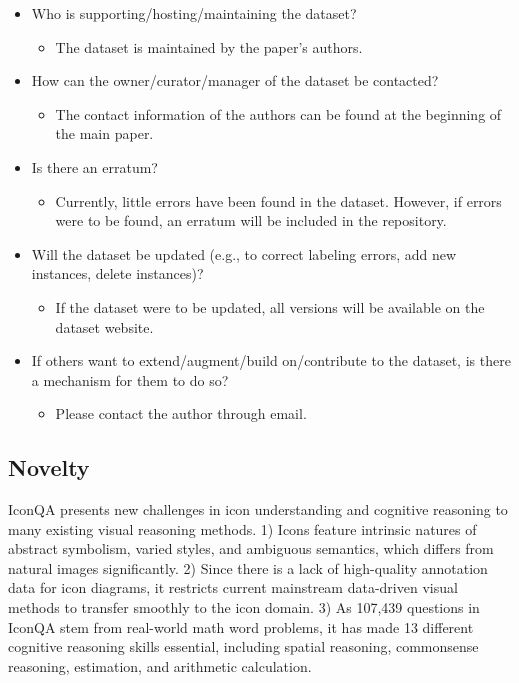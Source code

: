 \documentclass{article}
\begin{document}
\begin{itemize}
    \item Who is supporting/hosting/maintaining the dataset?
    \begin{itemize}
        \item The dataset is maintained by the paper's authors.
    \end{itemize}
    \item How can the owner/curator/manager of the dataset be contacted?
    \begin{itemize}
        \item The contact information of the authors can be found at the beginning of the main paper.
    \end{itemize}
    \item Is there an erratum?
    \begin{itemize}
        \item Currently, little errors have been found in the dataset. However, if errors were to be found, an erratum will be included in the repository.
    \end{itemize}
    \item Will the dataset be updated (e.g., to correct labeling errors, add new instances, delete instances)?
    \begin{itemize}
        \item If the dataset were to be updated, all versions will be available on the dataset website.
    \end{itemize}
    \item If others want to extend/augment/build on/contribute to the dataset, is there a mechanism for them to do so?
    \begin{itemize}
        \item Please contact the author through email.
    \end{itemize}

\end{itemize}

\subsection{Novelty}
IconQA presents new challenges in icon understanding and cognitive reasoning to many existing visual reasoning methods. 1) Icons feature intrinsic natures of abstract symbolism, varied styles, and ambiguous semantics, which differs from natural images significantly. 2) Since there is a lack of high-quality annotation data for icon diagrams, it restricts current mainstream data-driven visual methods to transfer smoothly to the icon domain. 3) As 107,439 questions in IconQA stem from real-world math word problems, it has made 13 different cognitive reasoning skills essential, including spatial reasoning, commonsense reasoning, estimation, and arithmetic calculation.
\end{document}
